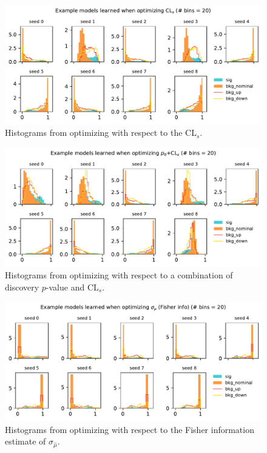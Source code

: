 \documentclass[
  11pt,
  numbers=noendperiod]{book}
\begin{document}
\begin{figure}

{\centering \includegraphics{./images/new-hist-models-CLs-20bin.pdf}

}

\caption{Histograms from optimizing with respect to the
\(\mathrm{CL}_s\).}

\end{figure}

\begin{figure}

{\centering \includegraphics{./images/new-hist-models-COMB-20bin.pdf}

}

\caption{Histograms from optimizing with respect to a combination of
discovery \(p\)-value and \(\mathrm{CL}_s\).}

\end{figure}

\begin{figure}

{\centering \includegraphics{./images/new-hist-models-poi_uncert-20bin.pdf}

}

\caption{Histograms from optimizing with respect to the Fisher
information estimate of \(\sigma_{\hat{\mu}}\).}

\end{figure}
\end{document}
